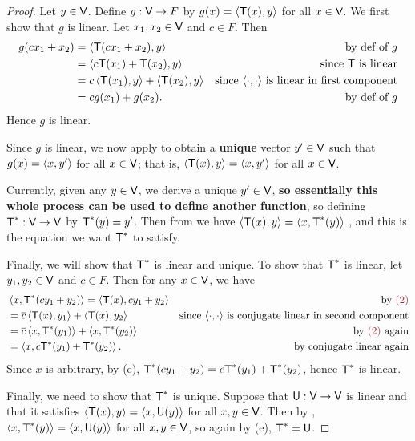 \begin{proof}
Let \(y \in \textsf{V}\).
Define \(g: \textsf{V} \to F\) by \(g(x) = \left< \textsf{T}(x), y \right>\) for all \(x \in \textsf{V}\).
We first show that \(g\) is linear.
Let \(x_1, x_2 \in \textsf{V}\) and \(c \in F\).
Then
\begin{align*}
    g(c x_1 + x_2) & = \left< \textsf{T}(c x_1 + x_2), y \right> & \text{by def of \(g\)} \\
        & = \left< c\textsf{T}(x_1) + \textsf{T}(x_2), y \right> & \text{since \(\textsf{T}\) is linear} \\
        & = c \left< \textsf{T}(x_1), y \right> + \left< \textsf{T}(x_2), y \right> & \text{since \(\left<\cdot, \cdot \right>\) is linear in first component} \\
        & = c g(x_1) + g(x_2). & \text{by def of \(g\)}
\end{align*}
Hence \(g\) is linear.

Since \(g\) is linear, we now apply  to obtain a \textbf{unique} vector \(y' \in \textsf{V}\) such that \(g(x) = \left< x, y' \right>\) for all \(x \in \textsf{V}\);
that is, \(\left< \textsf{T}(x), y \right> = \left< x, y' \right>\)  for all \(x \in \textsf{V}\).

Currently, given any \(y \in \textsf{V}\), we derive a unique \(y' \in \textsf{V}\), \textbf{so essentially this whole process can be used to define another function}, so
defining \(\textsf{T}^*: \textsf{V} \to \textsf{V}\) by \(\textsf{T}^*(y) = y'\).
Then from  we have \(\left< \textsf{T}(x), y \right> = \left< x, \textsf{T}^*(y) \right>\) , and this is the equation we want \(\textsf{T}^*\) to satisfy.

Finally, we will show that \(\textsf{T}^*\) is linear and unique.
To show that \(\textsf{T}^*\) is linear, let \(y_1, y_2 \in \textsf{V}\) and \(c \in F\).
Then for any \(x \in \textsf{V}\), we have
\begin{align*}
    & \LG x, \T^*(c y_1 + y_2) \RG = \LG \T(x), c y_1 + y_2 \RG & \text{by \MAROON{(2)}} \\
    & = \conjugatet{c} \LG \T(x), y_1 \RG + \LG \T(x), y_2 \RG & \text{since \(\InnerOp\) is conjugate linear in second component} \\
    & = \conjugatet{c} \LG x, \T^*(y_1) \RG + \LG x, \T^*(y_2) \RG & \text{by \MAROON{(2)} again} \\ 
    & = \LG x, c \T^*(y_1) + \T^*(y_2) \RG. & \text{by conjugate linear again}
\end{align*}
Since \(x\) is arbitrary, by (e), \(\textsf{T}^*(c y_1 + y_2) = c\textsf{T}^*(y_1) + \textsf{T}^*(y_2)\), hence \(\textsf{T}^*\) is linear.

Finally, we need to show that \(\textsf{T}^*\) is unique. Suppose that \(\textsf{U}: \textsf{V} \to \textsf{V}\) is linear and that it satisfies \(\left< \textsf{T}(x), y \right> = \left< x, \textsf{U}(y) \right>\) for all \(x, y \in \textsf{V}\).
Then by , \(\left< x, \textsf{T}^*(y) \right> = \left< x, \textsf{U}(y) \right>\) for all \(x, y \in \textsf{V}\), so again by (e), \(\textsf{T}^* = \textsf{U}\).
\end{proof}

